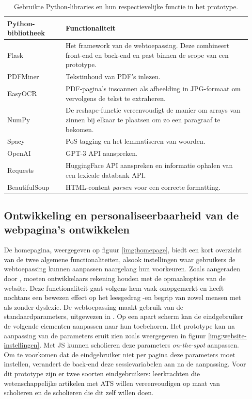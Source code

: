 \begin{center}
	\begin{table}[H]
	\begin{tabular}{ | m{4cm} | m{11cm} | } 
		\hline
		\textbf{Python-bibliotheek} & \textbf{Functionaliteit} \\
		\hline
		Flask					& Het framework van de webtoepassing. Deze combineert front-end en back-end en past binnen de scope van een prototype. \\ 
		\hline
		PDFMiner 				& Tekstinhoud van PDF's inlezen. \\ 
		\hline
		EasyOCR					& PDF-pagina's inscannen als afbeelding in JPG-formaat om vervolgens de tekst te extraheren. \\
		\hline
		NumPy 					& De reshape-functie vereenvoudigt de manier om arrays van zinnen bij elkaar te plaatsen om zo een paragraaf te bekomen. \\
		\hline		
		Spacy 					& PoS-tagging en het lemmatiseren van woorden. \\
		\hline
		OpenAI					& GPT-3 API aanspreken. \\
		\hline
		Requests				& HuggingFace API aanspreken en informatie ophalen van een lexicale databank API. \\
		\hline
		BeautifulSoup			& HTML-content \textit{parsen} voor een correcte formatting. \\
		\hline
	\end{tabular}
	\caption{Gebruikte Python-libraries en hun respectievelijke functie in het prototype.}
	\label{table:python-libraries}
	\end{table}
\end{center}

\subsection{Ontwikkeling en personaliseerbaarheid van de webpagina's ontwikkelen}

De homepagina, weergegeven op figuur \ref{img:homepage}, biedt een kort overzicht van de twee algemene functionaliteiten, alsook instellingen waar gebruikers de webtoepassing kunnen aanpassen naargelang hun voorkeuren. Zoals aangeraden door \textcite{Harvard2023}, moeten ontwikkelaars rekening houden met de opmaakopties van de website. Deze functionaliteit gaat volgens hem vaak onopgemerkt en heeft nochtans een bewezen effect op het leesgedrag -en begrip van zowel mensen met als zonder dyslexie. De webtoepassing maakt gebruik van de standaardparameters, uitgewezen in \textcite{Rello2013a, Rello2013b}. Op een apart scherm kan de eindgebruiker de volgende elementen aanpassen naar hun toebehoren. Het prototype kan na aanpassing van de parameters eruit zien zoals weergegeven in figuur \ref{img:website-instellingen}. Met JS kunnen scholieren deze parameters \textit{on-the-spot} aanpassen. Om te voorkomen dat de eindgebruiker niet per pagina deze parameters moet instellen, verandert de back-end deze sessievariabelen aan na de aanpassing. Voor dit prototype zijn er twee soorten eindgebruikers: leerkrachten die wetenschappelijke artikelen met ATS willen vereenvoudigen op maat van scholieren en de scholieren die dit zelf willen doen.


